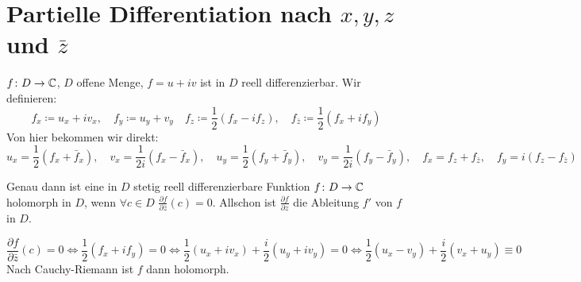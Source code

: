 \section*{Partielle Differentiation nach $ x,y,z $ und $ \bar z $}
$ f\colon D\rightarrow\mathbb{C} $, $ D $ offene Menge, $ f=u+iv $ ist in $ D $ reell differenzierbar. Wir definieren:
\[ f_x\coloneqq u_x+iv_x,\quad f_y\coloneqq u_y+v_y\quad f_z\coloneqq\frac{1}{2}(f_x-if_z),\quad f_{\bar z}\coloneqq\frac{1}{2}(f_x+if_y) \]
Von hier bekommen wir direkt:
\[ u_x=\frac{1}{2}(f_x+\bar f_x),\quad v_x=\frac{1}{2i}(f_x-\bar f_x),\quad u_y=\frac{1}{2}(f_y+\bar f_y),\quad v_y=\frac{1}{2i}(f_y-\bar f_y),\quad f_x=f_z+f_{\bar z},\quad f_y=i(f_z-f_{\bar z}) \]
\begin{satz}
	Genau dann ist eine in $ D $ stetig reell differenzierbare Funktion $ f\colon D\rightarrow \mathbb{C} $ holomorph in $ D $, wenn $ \forall c\in D $ $ \frac{\partial f}{\partial \bar z}(c)=0 $. Allschon ist $ \frac{\partial f}{\partial z} $ die Ableitung $ f' $ von $ f $ in $ D $.
\end{satz}
\begin{beweis}
	\[ \frac{\partial f}{\partial\bar z}(c)=0\Leftrightarrow\frac{1}{2}(f_x+if_y)=0\Leftrightarrow\frac{1}{2}(u_x+iv_x)+\frac{i}{2}(u_y+iv_y)=0\Leftrightarrow\frac{1}{2}(u_x-v_y)+\frac{i}{2}(v_x+u_y)\equiv 0 \]
	Nach Cauchy-Riemann ist $ f $ dann holomorph.
\end{beweis}
